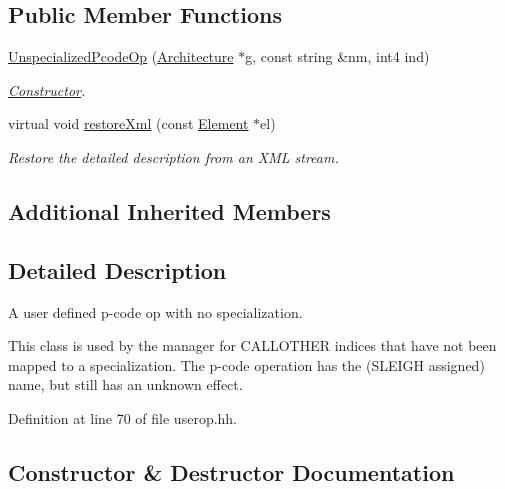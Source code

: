 \subsection*{Public Member Functions}
\begin{DoxyCompactItemize}
\item 
\mbox{\hyperlink{class_unspecialized_pcode_op_a987136fb213221a6ef655a48f460a76b}{Unspecialized\+Pcode\+Op}} (\mbox{\hyperlink{class_architecture}{Architecture}} $\ast$g, const string \&nm, int4 ind)
\begin{DoxyCompactList}\small\item\em \mbox{\hyperlink{class_constructor}{Constructor}}. \end{DoxyCompactList}\item 
virtual void \mbox{\hyperlink{class_unspecialized_pcode_op_a3e3e33005e96d5daef2aa26234d02d51}{restore\+Xml}} (const \mbox{\hyperlink{class_element}{Element}} $\ast$el)
\begin{DoxyCompactList}\small\item\em Restore the detailed description from an X\+ML stream. \end{DoxyCompactList}\end{DoxyCompactItemize}
\subsection*{Additional Inherited Members}


\subsection{Detailed Description}
A user defined p-\/code op with no specialization. 

This class is used by the manager for C\+A\+L\+L\+O\+T\+H\+ER indices that have not been mapped to a specialization. The p-\/code operation has the (S\+L\+E\+I\+GH assigned) name, but still has an unknown effect. 

Definition at line 70 of file userop.\+hh.



\subsection{Constructor \& Destructor Documentation}
\mbox{\label{class_unspecialized_pcode_op_a987136fb213221a6ef655a48f460a76b}} 
